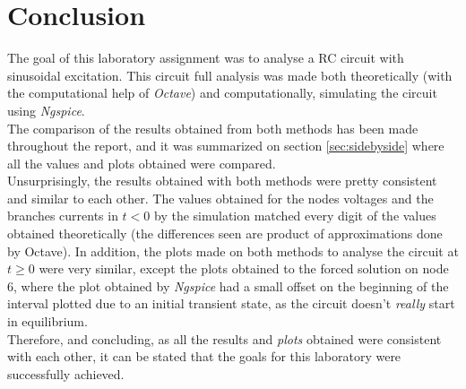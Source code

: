 \section{Conclusion}
The goal of this laboratory assignment was to analyse a RC circuit with sinusoidal excitation. This circuit full analysis was made both theoretically (with the computational help of \textit{Octave}) and computationally, simulating the circuit using \textit{Ngspice}.\\

The comparison of the results obtained from both methods has been made throughout the report, and it was summarized on section \ref{sec:sidebyside} where all the values and plots obtained were compared. \\

Unsurprisingly, the results obtained with both methods were pretty consistent and similar to each other. The values obtained for the nodes voltages and the branches currents in $t<0$ by the simulation matched every digit of the values obtained theoretically (the differences seen are product of approximations done by Octave). In addition, the plots made on both methods to analyse the circuit at $t \geq 0$ were very similar, except the plots obtained to the forced solution on node 6, where the plot obtained by \textit{Ngspice} had a small offset on the beginning of the interval plotted due to an initial transient state, as the circuit doesn't \textit{really} start in equilibrium.\\

Therefore, and concluding, as all the results and \textit{plots} obtained were consistent with each other, it can be stated that the goals for this laboratory were successfully achieved.